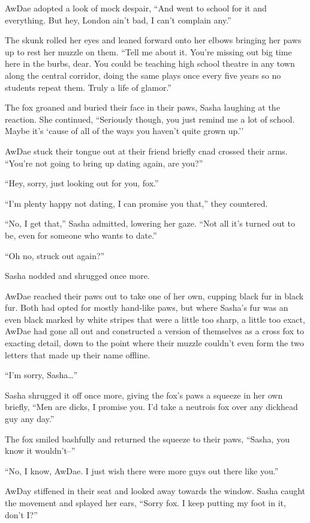 AwDae adopted a look of mock despair, ``And went to school for it and everything.  But hey, London ain't bad, I can't complain any.''

The skunk rolled her eyes and leaned forward onto her elbows bringing her paws up to rest her muzzle on them.  ``Tell me about it.  You're missing out big time here in the burbs, dear.  You could be teaching high school theatre in any town along the central corridor, doing the same plays once every five years so no students repeat them.  Truly a life of glamor.''

The fox groaned and buried their face in their paws, Sasha laughing at the reaction.  She continued, ``Seriously though, you just remind me a lot of school.  Maybe it's `cause of all of the ways you haven't quite grown up.''

AwDae stuck their tongue out at their friend briefly cnad crossed their arms. ``You're not going to bring up dating again, are you?''

``Hey, sorry, just looking out for you, fox.''

``I'm plenty happy not dating, I can promise you that,'' they countered.

``No, I get that,'' Sasha admitted, lowering her gaze.  ``Not all it's turned out to be, even for someone who wants to date.''

``Oh no, struck out again?''

Sasha nodded and shrugged once more.

AwDae reached their paws out to take one of her own, cupping black fur in black fur.  Both had opted for mostly hand-like paws, but where Sasha's fur was an even black marked by white stripes that were a little too sharp, a little too exact, AwDae had gone all out and constructed a version of themselves as a cross fox to exacting detail, down to the point where their muzzle couldn't even form the two letters that made up their name offline.

``I'm sorry, Sasha\ldots{}''

Sasha shrugged it off once more, giving the fox's paws a squeeze in her own briefly, ``Men are dicks, I promise you.  I'd take a neutrois fox over any dickhead guy any day.''

The fox smiled bashfully and returned the squeeze to their paws, ``Sasha, you know it wouldn't--''

``No, I know, AwDae.  I just wish there were more guys out there like you.''

AwDay stiffened in their seat and looked away towards the window.  Sasha caught the movement and splayed her ears, ``Sorry fox.  I keep putting my foot in it, don't I?''

